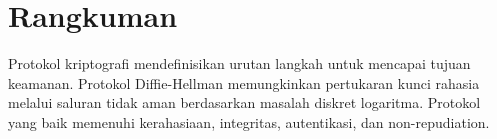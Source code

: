 \section*{Rangkuman}
Protokol kriptografi mendefinisikan urutan langkah untuk mencapai tujuan keamanan. Protokol Diffie-Hellman memungkinkan pertukaran kunci rahasia melalui saluran tidak aman berdasarkan masalah diskret logaritma. Protokol yang baik memenuhi kerahasiaan, integritas, autentikasi, dan non-repudiation.
